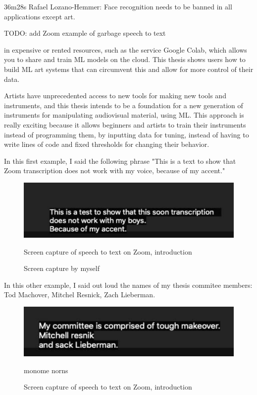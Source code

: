 \cite{website-talk-technology-and-public-art-rafael-lozano-hemmer}
36m28s
Rafael Lozano-Hemmer: Face recognition needs to be banned in all applications except art.

TODO: add Zoom example of garbage speech to text


 in expensive or rented resources, such as the service Google Colab, which allows you to share and train ML models on the cloud. This thesis shows users how to build \acrshort{ML} art systems that can circumvent this and allow for more control of their data.

Artists have unprecedented access to new tools for making new tools and instruments, and this thesis intends to be a foundation for a new generation of instruments for manipulating audiovisual material, using \acrshort{ML}. This approach is really exciting because it allows beginners and artists to train their instruments instead of programming them, by inputting data for tuning, instead of having to write lines of code and fixed thresholds for changing their behavior.

In this first example, I said the following phrase "This is a text to show that Zoom transcription does not work with my voice, because of my accent."

\begin{figure}[ht]
  \centering
  \includegraphics[width=0.75\linewidth,height=0.25\textheight,keepaspectratio]{images/zoom-introduction.jpg}
  \caption{Screen capture of speech to text on Zoom, introduction}
  \caption*{Screen capture by myself}
  \label{fig:zoom-voice}
\end{figure}

In this other example, I said out loud the names of my thesis commitee members: Tod Machover, Mitchel Resnick, Zach Lieberman.

\begin{figure}[ht]
  \centering
  \includegraphics[width=0.75\linewidth,height=0.25\textheight,keepaspectratio]{images/zoom-commitee.jpg}
  \caption{monome norns}
  \caption*{Screen capture of speech to text on Zoom, introduction}
  \label{fig:zoom-committee}
\end{figure}

